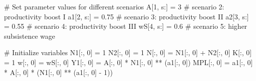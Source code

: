 \documentclass[
  letterpaper,
  DIV=11,
  numbers=noendperiod]{scrreprt}
\newenvironment{Shaded}{\begin{snugshade}}{\end{snugshade}}
\newcommand{\CommentTok}[1]{\textcolor[rgb]{0.37,0.37,0.37}{#1}}
\newcommand{\DecValTok}[1]{\textcolor[rgb]{0.68,0.00,0.00}{#1}}
\newcommand{\FloatTok}[1]{\textcolor[rgb]{0.68,0.00,0.00}{#1}}
\newcommand{\NormalTok}[1]{\textcolor[rgb]{0.00,0.23,0.31}{#1}}
\newcommand{\OperatorTok}[1]{\textcolor[rgb]{0.37,0.37,0.37}{#1}}
\begin{document}
\begin{tcolorbox}
\begin{Shaded}
\begin{Highlighting}[]
\CommentTok{\# Set parameter values for different scenarios}
\NormalTok{A[}\DecValTok{1}\NormalTok{, s:] }\OperatorTok{=} \DecValTok{3}     \CommentTok{\# scenario 2: productivity boost I}
\NormalTok{a1[}\DecValTok{2}\NormalTok{, s:] }\OperatorTok{=} \FloatTok{0.75} \CommentTok{\# scenario 3: productivity boost II}
\NormalTok{a2[}\DecValTok{3}\NormalTok{, s:] }\OperatorTok{=} \FloatTok{0.55} \CommentTok{\# scenario 4: productivity boost III}
\NormalTok{wS[}\DecValTok{4}\NormalTok{, s:] }\OperatorTok{=} \FloatTok{0.6}  \CommentTok{\# scenario 5: higher subsistence wage}

\CommentTok{\# Initialize variables}
\NormalTok{N1[:, }\DecValTok{0}\NormalTok{] }\OperatorTok{=} \DecValTok{1}
\NormalTok{N2[:, }\DecValTok{0}\NormalTok{] }\OperatorTok{=} \DecValTok{1}
\NormalTok{N[:, }\DecValTok{0}\NormalTok{] }\OperatorTok{=}\NormalTok{ N1[:, }\DecValTok{0}\NormalTok{] }\OperatorTok{+}\NormalTok{ N2[:, }\DecValTok{0}\NormalTok{]}
\NormalTok{K[:, }\DecValTok{0}\NormalTok{] }\OperatorTok{=} \DecValTok{1}
\NormalTok{w[:, }\DecValTok{0}\NormalTok{] }\OperatorTok{=}\NormalTok{ wS[:, }\DecValTok{0}\NormalTok{]}
\NormalTok{Y1[:, }\DecValTok{0}\NormalTok{] }\OperatorTok{=}\NormalTok{ A[:, }\DecValTok{0}\NormalTok{] }\OperatorTok{*}\NormalTok{ N1[:, }\DecValTok{0}\NormalTok{] }\OperatorTok{**}\NormalTok{ (a1[:, }\DecValTok{0}\NormalTok{])}
\NormalTok{MPL[:, }\DecValTok{0}\NormalTok{] }\OperatorTok{=}\NormalTok{ a1[:, }\DecValTok{0}\NormalTok{] }\OperatorTok{*}\NormalTok{ A[:, }\DecValTok{0}\NormalTok{] }\OperatorTok{*}\NormalTok{ (N1[:, }\DecValTok{0}\NormalTok{] }\OperatorTok{**}\NormalTok{ (a1[:, }\DecValTok{0}\NormalTok{] }\OperatorTok{{-}} \DecValTok{1}\NormalTok{))}


\end{Highlighting}
\end{Shaded}
\end{tcolorbox}
\end{document}
